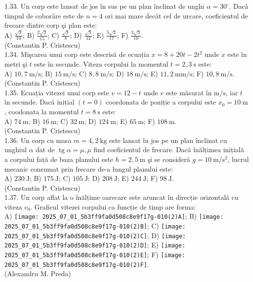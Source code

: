 1.33. Un corp este lansat de jos în sus pe un plan înclinat de unghi $\alpha=30^{\circ}$. Dacã timpul de coborâre este de $n=4$ ori mai mare decât cel de urcare, coeficientul de frecare dintre corp şi plan este:\\ A) $\frac{\sqrt{3}}{10}$; B) $\frac{2 \sqrt{3}}{15}$; C) $\frac{\sqrt{3}}{8}$; D) $\frac{\sqrt{3}}{12}$; E) $\frac{5 \sqrt{3}}{17}$; F) $\frac{3 \sqrt{3}}{10}$.\\ (Constantin P. Cristescu)\\

1.34. Mişcarea unui corp este descrisă de ecuația $x=8+20 t-2 t^{2}$ unde $x$ este în metri şi $t$ este în secunde. Viteza corpului la momentul $t=2,3 \mathrm{~s}$ este:\\ A) $10,7 \mathrm{~m} / \mathrm{s}$; B) $15 \mathrm{~m} / \mathrm{s}$; C) $8,8 \mathrm{~m} / \mathrm{s}$; D) $18 \mathrm{~m} / \mathrm{s}$; E) $11,2 \mathrm{~mm} / \mathrm{s}$; F) $10,8 \mathrm{~m} / \mathrm{s}$.\\ (Constantin P. Cristescu)\\

1.35. Ecuația vitezei unui corp este $v=12-t$ unde $v$ este măsurat în $\mathrm{m} / \mathrm{s}$, iar $t$ în secunde. Dacă inițial $(t=0)$ coordonata de poziție a corpului este $x_{0}=10 \mathrm{~m}$, coodonata la momentul $t=8 \mathrm{~s}$ este:\\ A) $74 \mathrm{~m}$; B) $16 \mathrm{~m}$; C) $32 \mathrm{~m}$; D) $124 \mathrm{~m}$; E) $65 \mathrm{~m}$; F) $108 \mathrm{~m}$.\\ (Constantin P. Cristescu)\\

1.36. Un corp cu masa $m=4,2 \mathrm{~kg}$ este lansat în jos pe un plan înclinat cu unghiul $\alpha$ dat de $\operatorname{tg} \alpha=\mu, \mu$ find coeficientul de frecare. Dacă înălțimea inițială a corpului față de baza planului este $h=2,5 \mathrm{~m}$ şi se consideră $g=10 \mathrm{~m} / \mathrm{s}^{2}$, lucrul mecanic consumat prin frecare de-a lungul planului este:\\ A) $230 \mathrm{~J}$; B) $175 \mathrm{~J}$; C) $105 \mathrm{~J}$; D) $208 \mathrm{~J}$; E) $244 \mathrm{~J}$; F) $98 \mathrm{~J}$.\\ (Constantin P. Cristescu)\\

1.37. Un corp aflat la o înălțime oarecare este aruncat în direcție orizontală cu viteza $v_{0}$. Graficul vitezei corpului ca funcție de timp are forma:\\ A) \texttt{[image: 2025\_07\_01\_5b3ff9fa0d508c8e9f17g-010(2)A]}; B) \texttt{[image: 2025\_07\_01\_5b3ff9fa0d508c8e9f17g-010(2)B]}; C) \texttt{[image: 2025\_07\_01\_5b3ff9fa0d508c8e9f17g-010(2)C]}; D) \texttt{[image: 2025\_07\_01\_5b3ff9fa0d508c8e9f17g-010(2)D]}; E) \texttt{[image: 2025\_07\_01\_5b3ff9fa0d508c8e9f17g-010(2)E]}; F) \texttt{[image: 2025\_07\_01\_5b3ff9fa0d508c8e9f17g-010(2)F]}.\\ (Alexandru M. Preda)\\

